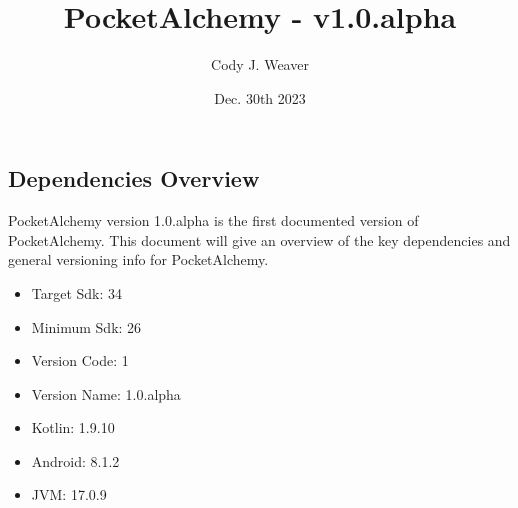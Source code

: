 \documentclass[12pt]{article}
\begin{document}
\title{PocketAlchemy - v1.0.alpha}
\author{Cody J. Weaver}
\date{Dec. 30th 2023}
\maketitle


\begin{center}
    
    \section*{Dependencies Overview}
    \indent PocketAlchemy version 1.0.alpha is the first documented version of PocketAlchemy. This document will give an overview of the 
    key dependencies and general versioning info for PocketAlchemy.

    \begin{itemize}
        \item Target Sdk: 34
        \item Minimum Sdk: 26
        \item Version Code: 1
        \item Version Name: 1.0.alpha
        \item Kotlin: 1.9.10
        \item Android: 8.1.2
        \item JVM\@: 17.0.9

    \end{itemize}

\end{center}
\end{document}
